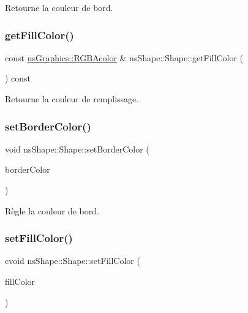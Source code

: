 Retourne la couleur de bord. 

\mbox{\label{classns_shape_1_1_shape_a8efbd1ac47497b188edeb019557ef754}} 
\subsubsection{\texorpdfstring{get\+Fill\+Color()}{getFillColor()}}
{\footnotesize\ttfamily const \hyperlink{classns_graphics_1_1_r_g_b_acolor}{ns\+Graphics\+::\+R\+G\+B\+Acolor} \& ns\+Shape\+::\+Shape\+::get\+Fill\+Color (\begin{DoxyParamCaption}{ }\end{DoxyParamCaption}) const}



Retourne la couleur de remplissage. 

\mbox{\label{classns_shape_1_1_shape_a48821100aa1856f188bdba257505adc3}} 
\subsubsection{\texorpdfstring{set\+Border\+Color()}{setBorderColor()}}
{\footnotesize\ttfamily void ns\+Shape\+::\+Shape\+::set\+Border\+Color (\begin{DoxyParamCaption}\item[{const \hyperlink{classns_graphics_1_1_r_g_b_acolor}{ns\+Graphics\+::\+R\+G\+B\+Acolor} \&}]{border\+Color }\end{DoxyParamCaption})}



Règle la couleur de bord. 

\mbox{\label{classns_shape_1_1_shape_aa0e9b22c076b83c4d5014b0213e5ce07}} 
\subsubsection{\texorpdfstring{set\+Fill\+Color()}{setFillColor()}}
{\footnotesize\ttfamily cvoid ns\+Shape\+::\+Shape\+::set\+Fill\+Color (\begin{DoxyParamCaption}\item[{const \hyperlink{classns_graphics_1_1_r_g_b_acolor}{ns\+Graphics\+::\+R\+G\+B\+Acolor} \&}]{fill\+Color }\end{DoxyParamCaption})}



